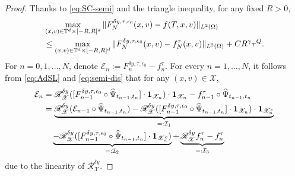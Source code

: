 \documentclass[11pt,reqno]{amsproc}
\numberwithin{equation}{section}
\begin{document}
\begin{proof}
Thanks to \eqref{eq:SC-semi} and the triangle inequality, for any fixed $R>0$,
\begin{align}\label{eq:intermediate}
&\max_{(x,v)\in\mathbb{T}^d\times [-R,R]^d}\|F_N^{\delta y,\tau,\epsilon_0}(x,v)-f(T,x,v)\|_{L^2(\Omega)}\\\notag
&\le \max_{(x,v)\in\mathbb{T}^d\times [-R,R]^d}\|F_N^{\delta y,\tau,\epsilon_0}(x,v)-f_N^\tau(x,v)\|_{L^2(\Omega)}+CR^\gamma\tau^Q.
\end{align}
For $n=0,1,\ldots,N$, denote $\mathcal{E}_{n}:=F^{\delta y,\tau,\epsilon_0}_{n}-f^\tau_n$. 
For every $n=1,\ldots, N$, it follows from \eqref{eq:AdSL} and \eqref{eq:semi-dis} that for any $(x,v)\in\mathscr{X}$,
\begin{align}\label{eq:error-X}
	\mathcal{E}_{n}&=\mathscr{R}_{\mathscr{X}}^{\delta y}([F^{\delta y,\tau,\epsilon_0}_{n-1}\circ\widehat{\Psi}_{t_{n-1},t_{n}}]\cdot\mathbf{1}_{\mathscr{X}_n})\cdot\mathbf{1}_{\mathscr{X}_n}-f_{n-1}^\tau\circ\widehat{\Psi}_{t_{n-1},t_n}\\\notag
	&=\underbrace{\mathscr{R}_{\mathscr{X}}^{\delta y}(\mathcal{E}_{n-1}\circ\widehat{\Psi}_{t_{n-1},t_n})-\mathscr{R}_{\mathscr{X}}^{\delta y}([F^{\delta y,\tau,\epsilon_0}_{n-1}\circ\widehat{\Psi}_{t_{n-1},t_{n}}]\cdot\mathbf{1}_{\mathscr{X}_n})\cdot\mathbf{1}_{\mathscr{X}_n^c}}_{=:\mathcal{I}_1}\\\notag
	&\quad\underbrace{-\mathscr{R}_{\mathscr{X}}^{\delta y}([F^{\delta y,\tau,\epsilon_0}_{n-1}\circ\widehat{\Psi}_{t_{n-1},t_{n}}]\cdot\mathbf{1}_{\mathscr{X}_n^c})}_{=:\mathcal{I}_2}+\underbrace{\mathscr{R}_{\mathscr{X}}^{\delta y}f^\tau_n- f_{n}^\tau}_{=:\mathcal{I}_3}
\end{align}
due to the linearity of $\mathscr{R}_{\mathscr{X}}^{\delta y}$.


\end{proof}
\end{document}

